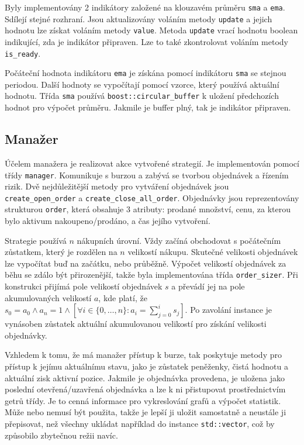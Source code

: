 Byly implementovány 2 indikátory založené na klouzavém průměru \texttt{sma} a \texttt{ema}.
Sdílejí stejné rozhraní.
Jsou aktualizovány voláním metody \texttt{update} a jejich hodnotu lze získat voláním metody \texttt{value}.
Metoda \texttt{update} vrací hodnotu boolean indikující, zda je indikátor připraven.
Lze to také zkontrolovat voláním metody \texttt{is\_ready}.

Počáteční hodnota indikátoru \texttt{ema} je získána pomocí indikátoru \texttt{sma} se stejnou periodou.
Další hodnoty se vypočítají pomocí vzorce, který používá aktuální hodnotu.
Třída \texttt{sma} používá \texttt{boost::circular\_buffer} k uložení předchozích hodnot pro výpočet průměru.
Jakmile je buffer plný, tak je indikátor připraven.

\subsection{Manažer}
Účelem manažera je realizovat akce vytvořené strategií.
Je implementován pomocí třídy \texttt{manager}.
Komunikuje s burzou a zabývá se tvorbou objednávek a řízením rizik.
Dvě nejdůležitější metody pro vytváření objednávek jsou \texttt{create\_open\_order} a \texttt{create\_close\_all\_order}.
Objednávky jsou reprezentovány strukturou \texttt{order}, která obsahuje 3 atributy: prodané množství, cenu, za kterou bylo aktivum nakoupeno/prodáno, a čas jejího vytvoření.

Strategie používá $n$ nákupních úrovní.
Vždy začíná obchodovat s počátečním zůstatkem, který je rozdělen na $n$ velikostí nákupu.
Skutečné velikosti objednávek lze vypočítat buď na začátku, nebo průběžně.
Výpočet velikostí objednávek za běhu se zdálo být přirozenější, takže byla implementována třída \texttt{order\_sizer}.
Při konstrukci přijímá pole velikostí objednávek $s$ a převádí jej na pole akumulovaných velikostí $a$, kde platí, že $s_0 = a_0 \land a_n = 1 \land [\forall i \in \{0,\dots,n\} : a_i = \sum_{j=0}^{i} s_j]$.
Po zavolání instance je vynásoben zůstatek aktuální akumulovanou velikostí pro získání velikosti objednávky.

Vzhledem k tomu, že má manažer přístup k burze, tak poskytuje metody pro přístup k jejímu aktuálnímu stavu, jako je zůstatek peněženky, čistá hodnotu a aktuální zisk aktivní pozice.
Jakmile je objednávka provedena, je uložena jako poslední otevřená/uzavřená objednávka a lze k ni přistupovat prostřednictvím getrů třídy.
Je to cenná informace pro vykreslování grafů a výpočet statistik.
Může nebo nemusí být použita, takže je lepší ji uložit samostatně a neustále ji přepisovat, než všechny ukládat například do instance \texttt{std::vector}, což by způsobilo zbytečnou režii navíc.

